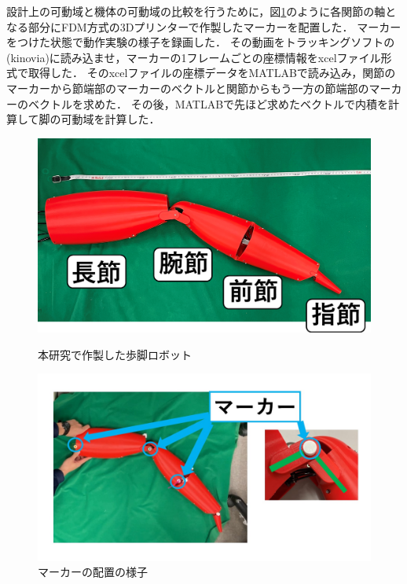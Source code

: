 設計上の可動域と機体の可動域の比較を行うために，図\ref{fig:marker_jikki}のように各関節の軸となる部分にFDM方式の3Dプリンターで作製したマーカーを配置した．
マーカーをつけた状態で動作実験の様子を録画した．
その動画をトラッキングソフトの(kinovia)に読み込ませ，マーカーの1フレームごとの座標情報をxcelファイル形式で取得した．
そのxcelファイルの座標データをMATLABで読み込み，関節のマーカーから節端部のマーカーのベクトルと関節からもう一方の節端部のマーカーのベクトルを求めた．
その後，MATLABで先ほど求めたベクトルで内積を計算して脚の可動域を計算した．
\begin{figure}[ht]
    \begin{minipage}{0.49\hsize}
      \centering
      \includegraphics[scale=0.2]{image/jikki_2.png}
      \caption{本研究で作製した歩脚ロボット}
      \label{fig:kanirobot_new}
    \end{minipage}
    \begin{minipage}{0.49\hsize}
      \centering
      \includegraphics[scale=0.2]{image/marker.jpg}
      \caption{マーカーの配置の様子}
      \label{fig:marker_jikki}
    \end{minipage}
\end{figure}
